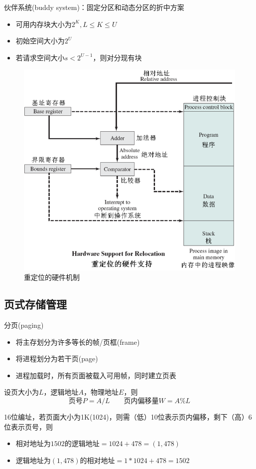 伙伴系统(buddy system)：固定分区和动态分区的折中方案
\begin{itemize}
    \item 可用内存块大小为$2^K,L\leq K\leq U$
    \item 初始空间大小为$2^U$
    \item 若请求空间大小$s<2^{U-1}$，则对分现有块
\end{itemize}

\begin{figure}[H]
    \centering
    \includegraphics[width=0.5\linewidth]{fig/relocation.png}
    \caption*{重定位的硬件机制}
\end{figure}

\subsection{页式存储管理}
分页(paging)
\begin{itemize}
    \item 将主存划分为许多等长的帧/页框(frame)
    \item 将进程划分为若干页(page)
    \item 进程加载时，所有页面被载入可用帧，同时建立页表
\end{itemize}

设页大小为$L$，逻辑地址$A$，物理地址$E$，则
\[\text{页号}P=A/L\qquad\text{页内偏移量}W=A\%L\]

\begin{example}
    16位编址，若页面大小为1K(1024)，则需（低）10位表示页内偏移，剩下（高）6位表示页号，则
    \begin{itemize}
        \item 相对地址为$1502$的逻辑地址$ = 1024 + 478 = (1, 478)$
        \item 逻辑地址为$(1, 478)$的相对地址$ = 1*1024 + 478 = 1502$
    \end{itemize}
\end{example}

